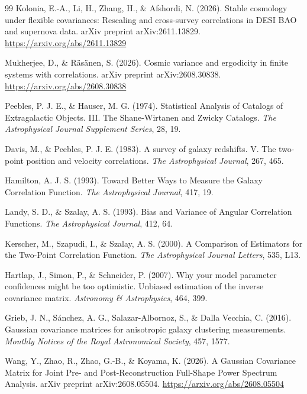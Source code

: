 \documentclass[letterpaper, 12pt]{article}
\begin{document}
\begin{thebibliography}{99}
         Kolonia, E.-A., Li, H., Zhang, H., \& Afshordi, N. (2026). Stable cosmology under flexible covariances: Rescaling and cross-survey correlations in DESI BAO and supernova data. arXiv preprint arXiv:2611.13829. \url{https://arxiv.org/abs/2611.13829}

         Mukherjee, D., \& Räsänen, S. (2026). Cosmic variance and ergodicity in finite systems with correlations. arXiv preprint arXiv:2608.30838. \url{https://arxiv.org/abs/2608.30838}

         Peebles, P. J. E., \& Hauser, M. G. (1974). Statistical Analysis of Catalogs of Extragalactic Objects. III. The Shane-Wirtanen and Zwicky Catalogs. \textit{The Astrophysical Journal Supplement Series}, 28, 19.

         Davis, M., \& Peebles, P. J. E. (1983). A survey of galaxy redshifts. V. The two-point position and velocity correlations. \textit{The Astrophysical Journal}, 267, 465.

         Hamilton, A. J. S. (1993). Toward Better Ways to Measure the Galaxy Correlation Function. \textit{The Astrophysical Journal}, 417, 19.

         Landy, S. D., \& Szalay, A. S. (1993). Bias and Variance of Angular Correlation Functions. \textit{The Astrophysical Journal}, 412, 64.

         Kerscher, M., Szapudi, I., \& Szalay, A. S. (2000). A Comparison of Estimators for the Two-Point Correlation Function. \textit{The Astrophysical Journal Letters}, 535, L13.

         Hartlap, J., Simon, P., \& Schneider, P. (2007). Why your model parameter confidences might be too optimistic. Unbiased estimation of the inverse covariance matrix. \textit{Astronomy \& Astrophysics}, 464, 399.

         Grieb, J. N., Sánchez, A. G., Salazar-Albornoz, S., \& Dalla Vecchia, C. (2016). Gaussian covariance matrices for anisotropic galaxy clustering measurements. \textit{Monthly Notices of the Royal Astronomical Society}, 457, 1577.

         Wang, Y., Zhao, R., Zhao, G.-B., \& Koyama, K. (2026). A Gaussian Covariance Matrix for Joint Pre- and Post-Reconstruction Full-Shape Power Spectrum Analysis. arXiv preprint arXiv:2608.05504. \url{https://arxiv.org/abs/2608.05504}


\end{thebibliography}
\end{document}
